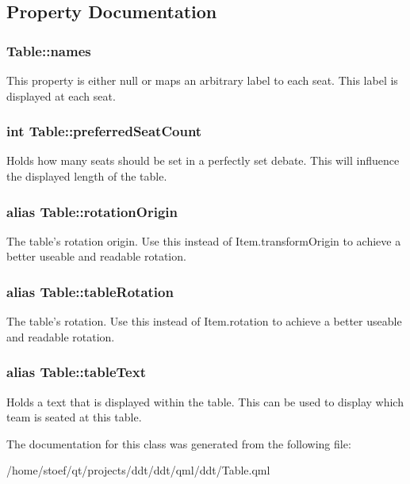 \subsection{Property Documentation}
\hypertarget{classTable_acdcaaceb37a19b80750e2b5e1c75cc63}{
\subsubsection[{names}]{ Table\-::names}}\label{classTable_acdcaaceb37a19b80750e2b5e1c75cc63}
This property is either {\ttfamily null} or maps an arbitrary label to each seat. This label is displayed at each seat. \hypertarget{classTable_adb0d1c7f4d3581f19f370429d6b88241}{
\subsubsection[{preferred\-Seat\-Count}]{\setlength{\rightskip}{0pt plus 5cm}int Table\-::preferred\-Seat\-Count}}\label{classTable_adb0d1c7f4d3581f19f370429d6b88241}
Holds how many seats should be set in a perfectly set debate. This will influence the displayed length of the table. \hypertarget{classTable_acc1414efc33cc8a93d1c36ee2b81ef88}{
\subsubsection[{rotation\-Origin}]{\setlength{\rightskip}{0pt plus 5cm}alias Table\-::rotation\-Origin}}\label{classTable_acc1414efc33cc8a93d1c36ee2b81ef88}
The table's rotation origin. Use this instead of {\ttfamily Item.\-transform\-Origin} to achieve a better useable and readable rotation. \hypertarget{classTable_a0fd0e5c3c8de91f59a26c3e6ec0aa149}{
\subsubsection[{table\-Rotation}]{\setlength{\rightskip}{0pt plus 5cm}alias Table\-::table\-Rotation}}\label{classTable_a0fd0e5c3c8de91f59a26c3e6ec0aa149}
The table's rotation. Use this instead of {\ttfamily Item.\-rotation} to achieve a better useable and readable rotation. \hypertarget{classTable_a99ba041de21998ee2f001613334e2b73}{
\subsubsection[{table\-Text}]{\setlength{\rightskip}{0pt plus 5cm}alias Table\-::table\-Text}}\label{classTable_a99ba041de21998ee2f001613334e2b73}
Holds a text that is displayed within the table. This can be used to display which team is seated at this table. 

The documentation for this class was generated from the following file\-:\begin{DoxyCompactItemize}
\item 
/home/stoef/qt/projects/ddt/ddt/qml/ddt/Table.\-qml\end{DoxyCompactItemize}

